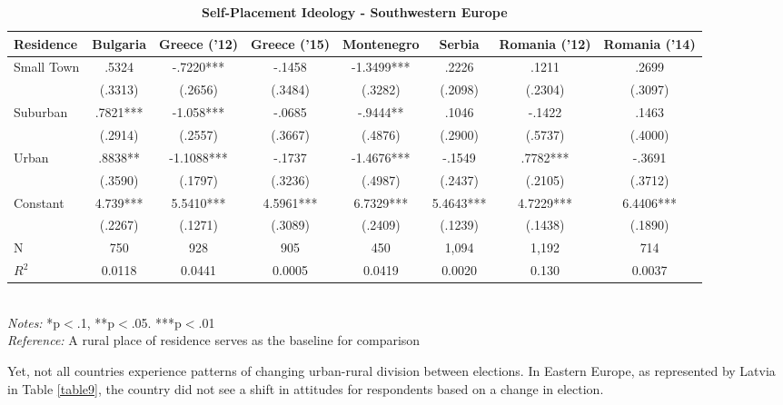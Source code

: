 \documentclass[12pt, titlepage]{article}
\newcommand\e{\emph}
\newcommand\tb{\textbf}
\begin{document}
\begin{landscape}
\begin{table}
	\centering
	\def\arraystretch{1.5}
	\caption{\tb{Self-Placement Ideology - Southwestern Europe}}
	\begin{tabulary}{\linewidth}{l c c c c c c c}
		\\
		\hline
		\tb{Residence}& \tb{Bulgaria}& \tb{Greece ('12)}& \tb{Greece ('15)} & \tb{Montenegro} & \tb{Serbia} & \tb{Romania ('12)} & \tb {Romania ('14)}\\
		\hline
		Small Town&.5324 &-.7220*** &-.1458 & -1.3499*** & .2226 & .1211 & .2699\\
		&(.3313)& (.2656) & (.3484) & (.3282) & (.2098)& (.2304) & (.3097)\\
		Suburban& .7821*** & -1.058*** &-.0685 & -.9444** &.1046 &-.1422 &.1463\\
		& (.2914) &(.2557) & (.3667) & (.4876) &(.2900) & (.5737) & (.4000)\\
		Urban& .8838**& -1.1088*** & -.1737 & -1.4676*** & -.1549 & .7782*** & -.3691\\
		& (.3590)& (.1797) & (.3236) & (.4987) & (.2437) & (.2105) & (.3712)\\
		Constant& 4.739*** &5.5410*** & 4.5961*** &6.7329*** & 5.4643*** & 4.7229*** & 6.4406***\\
		& (.2267) & (.1271)  & (.3089) & (.2409) & (.1239) & (.1438) & (.1890)\\
		N& 750 & 928 & 905 & 450 & 1,094 & 1,192 &714\\
		$R^2$&0.0118 &0.0441& 0.0005 &0.0419 & 0.0020 & 0.130 &0.0037 \\
		\hline
	\end{tabulary}
\\
\e{Notes:} *p$<$.1, **p$<$.05. ***p$<$.01 \\
\e{Reference:} A rural place of residence serves as the baseline for comparison
\label{table8}
\end{table}
\end{landscape}

Yet, not all countries experience patterns of changing urban-rural division between elections. In Eastern Europe, as represented by Latvia in Table \ref{table9}, the country did not see a shift in attitudes for respondents based on a change in election. 
\end{document}
